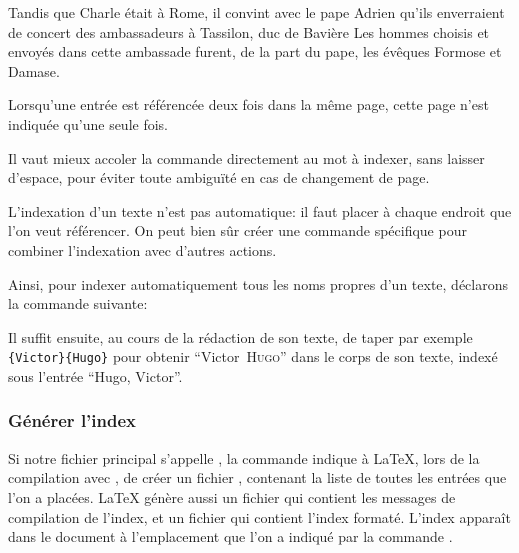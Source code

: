 \begin{latexcode}
Tandis que Charle était à Rome, il convint
avec le pape Adrien qu’ils enverraient de concert
des ambassadeurs à Tassilon, duc de Bavière
\textelp{}
Les hommes choisis et envoyés dans cette ambassade furent, de 
la part du pape, les évêques Formose et 
Damase\textelp{}.
\end{latexcode}



 Lorsqu'une entrée est référencée deux fois dans la même page, cette page n'est indiquée qu'une seule fois. 

\begin{attention}
Il vaut mieux accoler la commande  directement au  mot à indexer, sans laisser d'espace, pour éviter toute ambiguïté en cas de changement de page.

\end{attention}


L'indexation d'un texte n'est pas automatique: il faut placer  à chaque endroit  que l'on veut référencer. On  peut bien sûr créer une commande  spécifique pour combiner l'indexation avec d'autres actions.

Ainsi, pour indexer automatiquement tous les noms propres d'un texte, déclarons la commande suivante:\label{indexauteur}

\begin{latexcode}
\newcommand\auteur[2]{#1~\textsc{#2}\index{#2, #1}\xspace}
\end{latexcode}

\renewcommand\auteur[2]{#1~\textsc{#2}\xspace}

Il suffit ensuite, au cours de la rédaction de son texte, de taper par exemple \verb|{Victor}{Hugo}| pour obtenir \enquote{\auteur{Victor}{Hugo}} dans le corps de son texte, indexé sous l'entrée \enquote{Hugo, Victor}.


\subsubsection{Générer l'index}

Si notre fichier principal s'appelle ,  la commande  indique à \LaTeX{}, lors de la compilation avec \XeLaTeX , de créer un fichier , contenant la liste de toutes les entrées que l'on a placées. 
\LaTeX{} génère aussi un fichier  qui contient les messages de compilation de l'index, et un fichier  qui contient l'index formaté.
L'index  apparaît dans le document à l'emplacement que l'on a indiqué par la commande .


